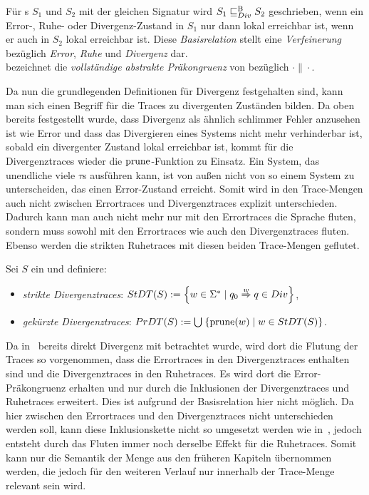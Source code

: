 \begin{Def}
\label{DefDivBasisrel}
Für \EIO{}s $S_1$ und $S_2$ mit der gleichen Signatur wird $S_1\sqsubseteq _{Div}^\mathrm{B} S_2$
geschrieben, wenn ein Error-, Ruhe- oder Divergenz-Zustand in $S_1$ nur
dann lokal erreichbar ist, wenn er auch in $S_2$ lokal erreichbar ist. Diese
\emph{Basisrelation} stellt eine \emph{Verfeinerung} bezüglich \emph{Error},
\emph{Ruhe} und \emph{Divergenz} dar.\\
\DCRel{} bezeichnet die \emph{vollständige abstrakte Präkongruenz} von \DBRel{}
bezüglich $\cdot\|\cdot$.
\end{Def}

Da nun die grundlegenden Definitionen für Divergenz festgehalten sind,
kann man sich einen Begriff für die Traces zu divergenten Zuständen
bilden. Da oben bereits festgestellt wurde, dass Divergenz als ähnlich
\glqq{}schlimmer Fehler\grqq{} anzusehen ist wie Error und dass das Divergieren
eines Systems nicht mehr verhinderbar ist, sobald ein divergenter Zustand lokal
erreichbar ist, kommt für die Divergenztraces wieder die $\mathrm{prune}$-Funktion zu
Einsatz. Ein System, das unendliche viele $\tau$s ausführen kann, ist von
außen nicht von so einem System zu unterscheiden, das einen Error-Zustand
erreicht. Somit wird in den Trace-Mengen auch nicht zwischen Errortraces und
Divergenztraces explizit unterschieden. Dadurch kann man auch nicht mehr nur mit
den Errortraces die Sprache fluten, sondern muss sowohl mit den Errortraces wie
auch den Divergenztraces fluten. Ebenso werden die strikten Ruhetraces mit
diesen beiden Trace-Mengen geflutet.

\begin{Def}[Divergenztraces]
  Sei $S$ ein \EIO{} und definiere:
  \begin{itemize}
    \item \emph{strikte Divergenztraces}: $StDT{}(S) := \left\{w\in\Sigma ^*\mid
      q_0 \overset{w}{\Rightarrow} q\in Div\right\}$,
    \item \emph{gekürzte Divergenztraces}: $PrDT{}(S) :=
      \bigcup\hspace{1pt}\left\{\mathrm{prune}{}(w)\mid w\in StDT{}(S)\right\}$.
  \end{itemize}
\end{Def}

Da in~\cite{Chilton2013} bereits direkt Divergenz mit betrachtet wurde, wird
dort die Flutung der Traces so vorgenommen, dass die Errortraces in den
Divergenztraces enthalten sind und die Divergenztraces in den Ruhetraces.
Es wird dort die Error-Präkongruenz erhalten und nur durch die Inklusionen der
Divergenztraces und Ruhetraces erweitert. Dies ist aufgrund der Basisrelation
hier nicht möglich. Da hier zwischen den Errortraces und den Divergenztraces
nicht unterschieden werden soll, kann diese Inklusionskette nicht so umgesetzt
werden wie in~\cite{Chilton2013}, jedoch
entsteht durch das Fluten immer noch derselbe Effekt für die Ruhetraces. Somit
kann nur die Semantik der Menge \ET{} aus den früheren Kapiteln übernommen
werden, die jedoch für den weiteren Verlauf nur innerhalb der Trace-Menge
\EDT{} relevant sein wird.

